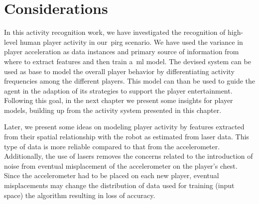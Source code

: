 \section{Considerations}

In this activity recognition work, we have investigated the recognition of high-level human player activity in our~\gls{pirg} scenario. We have used the variance in player acceleration as data instances and primary source of information from where to extract features and then train a~\gls{ml} model. The devised system can be used as base to model the overall player behavior by differentiating activity frequencies among the different players. This model can than be used to guide the agent in the adaption of its strategies to support the player entertainment. Following this goal, in the next chapter we present some insights for player models, building up from the activity system presented in this chapter.

Later, we present some ideas on modeling player activity by features extracted from their spatial relationship with the robot as estimated from laser data. This type of data is more reliable compared to that from the accelerometer. Additionally, the use of lasers removes the concerns related to the introduction of noise from eventual misplacement of the accelerometer on the player's chest. Since the accelerometer had to be placed on each new player, eventual misplacements may change the distribution of data used for training (input space) the algorithm resulting in loss of accuracy. 
